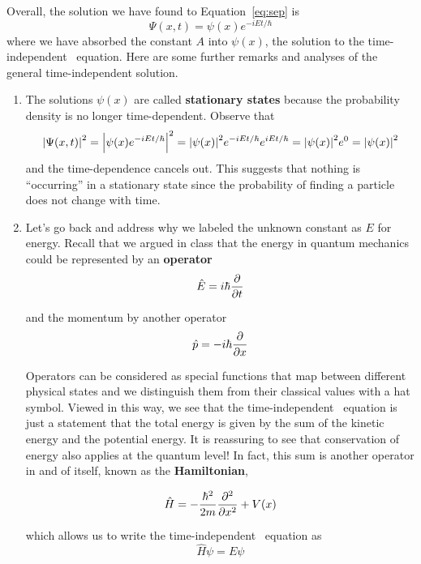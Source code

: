 Overall, the solution we have found to Equation~\ref{eq:sep} is
\begin{equation}
	\Psi(x,t) = \psi(x)e^{-iEt/\hbar}
\end{equation}
where we have absorbed the constant $A$ into $\psi(x)$, the solution to the time-independent \Sch\ equation. Here are some further remarks and analyses of the general time-independent solution.
\begin{enumerate}[1.]
	\item The solutions $\psi(x)$ are called \textbf{stationary states} because the probability density is no longer time-dependent. Observe that 
	\begin{equation*}
		\abs{\Psi(x,t)}^2 = \abs{\psi(x)e^{-iEt/\hbar}}^2 = \abs{\psi(x)}^2e^{-iEt/\hbar}e^{iEt/\hbar} = \abs{\psi(x)}^2e^0 = \abs{\psi(x)}^2
	\end{equation*}
	and the time-dependence cancels out. This suggests that nothing is ``occurring'' in a stationary state since the probability of finding a particle does not change with time.
	
	\item Let's go back and address why we labeled the unknown constant as $E$ for energy. Recall that we argued in class that the energy in quantum mechanics could be represented by an \textbf{operator} 
	\begin{equation}
		\hat{E} = i\hbar\pdv{t} \label{eq:Eop}
	\end{equation}
	
	and the momentum by another operator 
	\begin{equation}
		\hat{p} = -i\hbar\pdv{x} \label{eq:Pop}
	\end{equation}
	
	Operators can be considered as special functions that map between different physical states and we distinguish them from their classical values with a hat symbol. Viewed in this way, we see that the time-independent \Sch\ equation is just a statement that the total energy is given by the sum of the kinetic energy and the potential energy. It is reassuring to see that conservation of energy also applies at the quantum level! In fact, this sum is another operator in and of itself, known as the \textbf{Hamiltonian},
	\begin{tcolorbox}[title = Hamiltonian operator] \vspace{-2ex}
		\begin{equation}
		\hat{H} = -\frac{\hbar^2}{2m}\pdv[2]{x}+V(x) \label{eq:ham}
		\end{equation}
	\end{tcolorbox}
	which allows us to write the time-independent \Sch\ equation as
	\begin{equation}
		\hat{H}\psi = E\psi \label{eq:tise-ham}
	\end{equation}
	

\end{enumerate}
